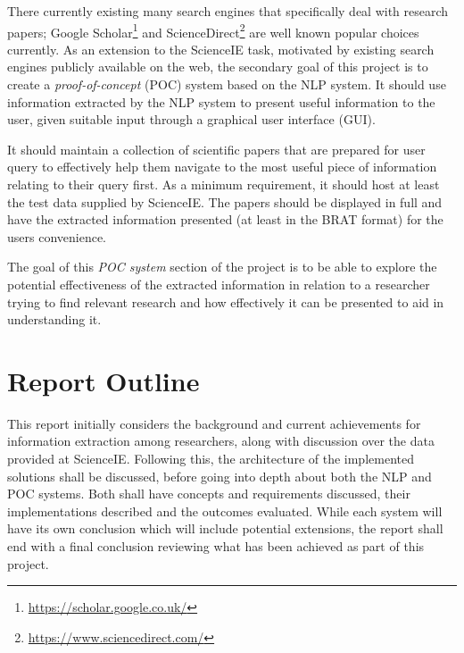 There currently existing many search engines that specifically deal with research papers; Google Scholar\footnote{\href{https://scholar.google.co.uk/}{https://scholar.google.co.uk/}} and ScienceDirect\footnote{\href{https://www.sciencedirect.com/}{https://www.sciencedirect.com/}} are well known popular choices currently. As an extension to the ScienceIE task, motivated by existing search engines publicly available on the web, the secondary goal of this project is to create a \textit{proof-of-concept} (POC) system based on the NLP system. It should use information extracted by the NLP system to present useful information to the user, given suitable input through a graphical user interface (GUI). 

It should maintain a collection of scientific papers that are prepared for user query to effectively help them navigate to the most useful piece of information relating to their query first. As a minimum requirement, it should host at least the test data supplied by ScienceIE. The papers should be displayed in full and have the extracted information presented (at least in the BRAT format) for the users convenience.

The goal of this \textit{POC system} section of the project is to be able to explore the potential effectiveness of the extracted information in relation to a researcher trying to find relevant research and how effectively it can be presented to aid in understanding it. 

\section{Report Outline}

This report initially considers the background and current achievements for information extraction among researchers, along with discussion over the data provided at ScienceIE. Following this, the architecture of the implemented solutions shall be discussed, before going into depth about both the NLP and POC systems. Both shall have concepts and requirements discussed, their implementations described and the outcomes evaluated. While each system will have its own conclusion which will include potential extensions, the report shall end with a final conclusion reviewing what has been achieved as part of this project.
